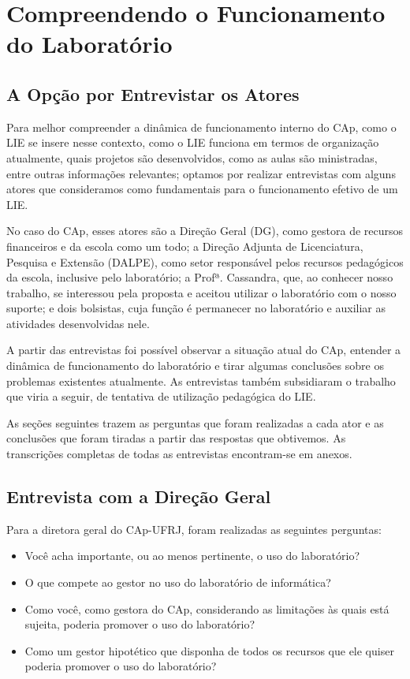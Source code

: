 \chapter{Compreendendo o Funcionamento do Laboratório}\label{chp:LABEL_CHP_ENT}

\section{A Opção por Entrevistar os Atores}\label{chp:LABEL_CHP_ENT_SEC_OPC}

Para melhor compreender a dinâmica de funcionamento interno do CAp, como o LIE se insere nesse contexto, como o LIE funciona em termos de organização atualmente, quais projetos são desenvolvidos, como as aulas são ministradas, entre outras informações relevantes; optamos por realizar entrevistas com alguns atores que consideramos como fundamentais para o funcionamento efetivo de um LIE.

No caso do CAp, esses atores são a Direção Geral (DG), como gestora de recursos financeiros e da escola como um todo; a Direção Adjunta de Licenciatura, Pesquisa e Extensão (DALPE), como setor responsável pelos recursos pedagógicos da escola, inclusive pelo laboratório; a Profª. Cassandra, que, ao conhecer nosso trabalho, se interessou pela proposta e aceitou utilizar o laboratório com o nosso suporte; e dois bolsistas, cuja função é permanecer no laboratório e auxiliar as atividades desenvolvidas nele.

A partir das entrevistas foi possível observar a situação atual do CAp, entender a dinâmica de funcionamento do laboratório e tirar algumas conclusões sobre os problemas existentes atualmente. As entrevistas também subsidiaram o trabalho que viria a seguir, de tentativa de utilização pedagógica do LIE.

As seções seguintes trazem as perguntas que foram realizadas a cada ator e as conclusões que foram tiradas a partir das respostas que obtivemos. As transcrições completas de todas as entrevistas encontram-se em anexos.

\section{Entrevista com a Direção Geral}\label{chp:LABEL_CHP_ENT_SEC_DG}

Para a diretora geral do CAp-UFRJ, foram realizadas as seguintes perguntas:
\begin{itemize}
\item Você acha importante, ou ao menos pertinente, o uso do laboratório?
\item O que compete ao gestor no uso do laboratório de informática?
\item Como você, como gestora do CAp, considerando as limitações às quais está sujeita, poderia promover o uso do laboratório?
\item Como um gestor hipotético que disponha de todos os recursos que ele quiser poderia promover o uso do laboratório?
\end{itemize}

